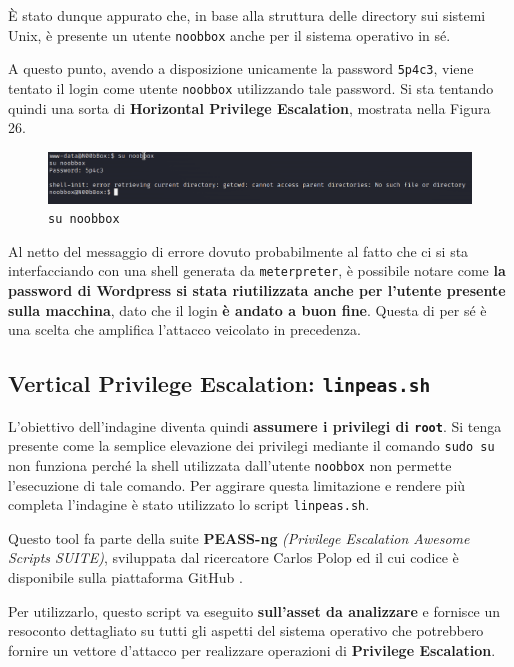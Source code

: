 \documentclass[a4paper, 12pt, oneside]{article}
\begin{document}
È stato dunque appurato che, in base alla struttura delle directory sui sistemi Unix, è presente un utente \texttt{noobbox} anche per il sistema operativo in sé.

A questo punto, avendo a disposizione unicamente la password \texttt{5p4c3}, viene tentato il login come utente \texttt{noobbox} utilizzando tale password. Si sta tentando quindi una sorta di \textbf{Horizontal Privilege Escalation}, mostrata nella Figura 26.

\begin{figure}[h!]
    \centering
    \includegraphics[width=\textwidth]{img/su-noobbox.png}
    \caption{\texttt{su noobbox}}
\end{figure}

\newpage
Al netto del messaggio di errore dovuto probabilmente al fatto che ci si sta interfacciando con una shell generata da \texttt{meterpreter}, è possibile notare come \textbf{la password di Wordpress si stata riutilizzata anche per l'utente presente sulla macchina}, dato che il login \textbf{è andato a buon fine}. Questa di per sé è una scelta che amplifica l'attacco veicolato in precedenza.

\subsection{Vertical Privilege Escalation: \texttt{linpeas.sh}}
L'obiettivo dell'indagine diventa quindi \textbf{assumere i privilegi di \texttt{root}}. Si tenga presente come la semplice elevazione dei privilegi mediante il comando \texttt{sudo su} non funziona perché la shell utilizzata dall'utente \texttt{noobbox} non permette l'esecuzione di tale comando. Per aggirare questa limitazione e rendere più completa l'indagine è stato utilizzato lo script \texttt{linpeas.sh}.

Questo tool fa parte della suite \textbf{PEASS-ng} \textit{(Privilege Escalation Awesome Scripts SUITE)}, sviluppata dal ricercatore Carlos Polop ed il cui codice è disponibile sulla piattaforma GitHub \cite{linpeas}.

Per utilizzarlo, questo script va eseguito \textbf{sull'asset da analizzare} e fornisce un resoconto dettagliato su tutti gli aspetti del sistema operativo che potrebbero fornire un vettore d'attacco per realizzare operazioni di \textbf{Privilege Escalation}.
\end{document}
